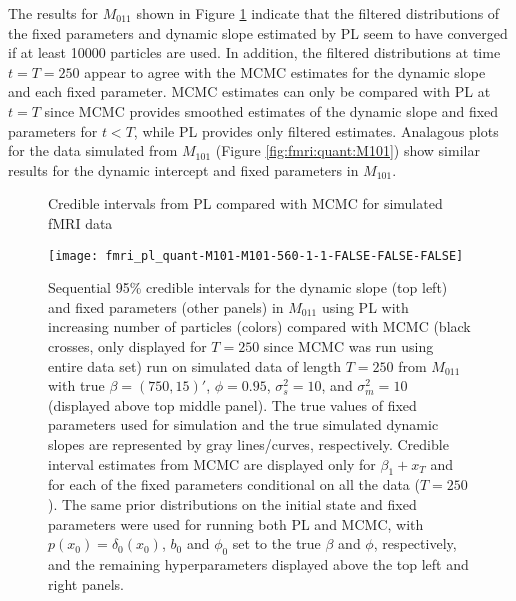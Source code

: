 The results for $M_{011}$ shown in Figure \ref{fig:fmri:quant:M011} indicate that the filtered distributions of the fixed parameters and dynamic slope estimated by PL seem to have converged if at least 10000 particles are used. In addition, the filtered distributions at time $t = T = 250$ appear to agree with the MCMC estimates for the dynamic slope and each fixed parameter. MCMC estimates can only be compared with PL at $t = T$ since MCMC provides smoothed estimates of the dynamic slope and fixed parameters for $t < T$, while PL provides only filtered estimates. Analagous plots for the data simulated from $M_{101}$ (Figure \ref{fig:fmri:quant:M101}) show similar results for the dynamic intercept and fixed parameters in $M_{101}$.

\begin{figure}
\ssp
\centering
\caption{Credible intervals from PL compared with MCMC for simulated fMRI data} \label{fig:fmri:quant:M011}
\texttt{[image: fmri\_pl\_quant-M101-M101-560-1-1-FALSE-FALSE-FALSE]}
\caption*{Sequential 95\% credible intervals for the dynamic slope (top left) and fixed parameters (other panels) in $M_{011}$ using PL with increasing number of particles (colors) compared with MCMC (black crosses, only displayed for $T = 250$ since MCMC was run using entire data set) run on simulated data of length $T = 250$ from $M_{011}$ with true $\beta = (750,15)'$, $\phi = 0.95$, $\sigma^2_s = 10$, and $\sigma^2_m = 10$ (displayed above top middle panel). The true values of fixed parameters used for simulation and the true simulated dynamic slopes are represented by gray lines/curves, respectively. Credible interval estimates from MCMC are displayed only for $\beta_1 + x_T$ and for each of the fixed parameters conditional on all the data ($T = 250$). The same prior distributions on the initial state and fixed parameters were used for running both PL and MCMC, with $p(x_0) = \delta_{0}(x_0)$, $b_0$ and $\phi_0$ set to the true $\beta$ and $\phi$, respectively, and the remaining hyperparameters displayed above the top left and right panels.}
\end{figure}

